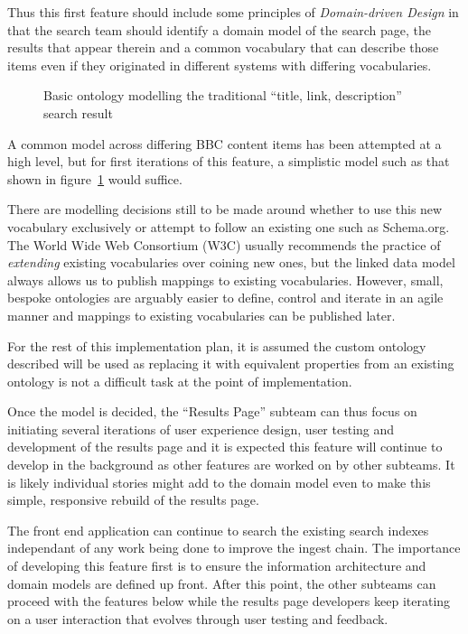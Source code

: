Thus this first feature should include some principles of
\emph{Domain-driven Design}\cite{evans2004domain}
in that the search team should identify
a domain model of the search page, the results that appear therein
and a common vocabulary that can describe those items even if
they originated in different systems with differing vocabularies.

\begin{figure}
  \begin{center}
    \begin{dot2tex}[dot,pgf,scale=0.42,options=-traw]
      
    \end{dot2tex}
  \end{center}
  \caption{Basic ontology modelling the traditional ``title, link, description'' search result\label{fig:initial-ontology}}
\end{figure}

A common model across differing BBC content items has been
attempted\cite{fenning2014applicability} at a high level, but
for first iterations of this feature, a simplistic model
such as that shown in figure~\ref{fig:initial-ontology}
would suffice.

There are modelling decisions still to be
made around whether to use this new vocabulary exclusively
or attempt to follow an existing one such as Schema.org. The
World Wide Web Consortium (W3C) usually recommends the practice
of \emph{extending} existing vocabularies over coining new
ones, but the linked data model always allows us to publish
mappings to existing vocabularies. However, small, bespoke
ontologies are arguably easier to define, control and iterate
in an agile manner and mappings to existing vocabularies
can be published later.

For the rest of this implementation plan, it is assumed
the custom ontology described will be used as replacing it
with equivalent properties from an existing ontology
is not a difficult task at the point of implementation.

Once the model is decided,
the ``Results Page'' subteam can thus focus on initiating
several iterations of user experience design, user testing
and development of the results page and it is expected this
feature will continue to develop in the background as
other features are worked on by other subteams. It is likely
individual stories might add to the domain model even
to make this simple, responsive rebuild of the results page.

The front end application can continue to search the
existing search indexes independant of any work being done
to improve the ingest chain. The importance of developing
this feature first is to ensure the information architecture
and domain models are defined up front. After this point,
the other subteams can proceed with the features below
while the results page developers keep iterating on
a user interaction that evolves through user testing and
feedback.

